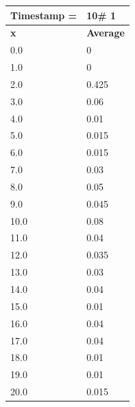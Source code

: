 \begin{tabular}{|l||l|}
\hline
\textbf{Timestamp =} & \textbf{10}\# 1\\\hline
	\textbf{x} & \textbf{Average} \\ \hline
\hline
	0.0 & 0 \\ \hline
	1.0 & 0 \\ \hline
	2.0 & 0.425 \\ \hline
	3.0 & 0.06 \\ \hline
	4.0 & 0.01 \\ \hline
	5.0 & 0.015 \\ \hline
	6.0 & 0.015 \\ \hline
	7.0 & 0.03 \\ \hline
	8.0 & 0.05 \\ \hline
	9.0 & 0.045 \\ \hline
	10.0 & 0.08 \\ \hline
	11.0 & 0.04 \\ \hline
	12.0 & 0.035 \\ \hline
	13.0 & 0.03 \\ \hline
	14.0 & 0.04 \\ \hline
	15.0 & 0.01 \\ \hline
	16.0 & 0.04 \\ \hline
	17.0 & 0.04 \\ \hline
	18.0 & 0.01 \\ \hline
	19.0 & 0.01 \\ \hline
	20.0 & 0.015 \\ \hline
\end{tabular}
